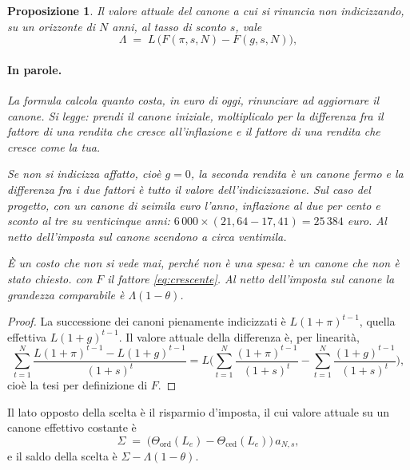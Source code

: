 \documentclass[11pt,a4paper]{article}
\theoremstyle{definition}
\theoremstyle{plain}
\newtheorem{proposizione}[definizione]{Proposizione}
\begin{document}
\begin{proposizione}
Il valore attuale del canone a cui si rinuncia non indicizzando, su un orizzonte di $N$ anni, al tasso di sconto $s$, vale
\begin{equation}
\Lambda \;=\; L\,\Big(F(\pi,s,N) - F(g,s,N)\Big),
\label{eq:rinuncia}
\end{equation}

\paragraph{In parole.} La formula calcola quanto costa, in euro di oggi, rinunciare ad aggiornare il canone. Si legge: prendi il canone iniziale, moltiplicalo per la differenza fra il fattore di una rendita che cresce all'inflazione e il fattore di una rendita che cresce come la tua.

Se non si indicizza affatto, cioè $g = 0$, la seconda rendita è un canone fermo e la differenza fra i due fattori è tutto il valore dell'indicizzazione. Sul caso del progetto, con un canone di seimila euro l'anno, inflazione al due per cento e sconto al tre su venticinque anni: $6\,000 \times (21{,}64 - 17{,}41) = 25\,384$ euro. Al netto dell'imposta sul canone scendono a circa ventimila.

È un costo che non si vede mai, perché non è una spesa: è un canone che non è stato chiesto.
con $F$ il fattore \eqref{eq:crescente}. Al netto dell'imposta sul canone la grandezza comparabile è $\Lambda(1-\theta)$.
\end{proposizione}

\begin{proof}
La successione dei canoni pienamente indicizzati è $L(1+\pi)^{t-1}$, quella effettiva $L(1+g)^{t-1}$. Il valore attuale della differenza è, per linearità,
\[
\sum_{t=1}^{N}\frac{L(1+\pi)^{t-1} - L(1+g)^{t-1}}{(1+s)^t}
= L\Big(\sum_{t=1}^{N}\frac{(1+\pi)^{t-1}}{(1+s)^t} - \sum_{t=1}^{N}\frac{(1+g)^{t-1}}{(1+s)^t}\Big),
\]
cioè la tesi per definizione di $F$.
\end{proof}

Il lato opposto della scelta è il risparmio d'imposta, il cui valore attuale su un canone effettivo costante è
\begin{equation}
\Sigma \;=\; \big(\Theta_{\text{ord}}(L_e) - \Theta_{\text{ced}}(L_e)\big)\,a_{N,s},
\label{eq:risparmio}
\end{equation}
e il saldo della scelta è $\Sigma - \Lambda(1-\theta)$.
\end{document}
